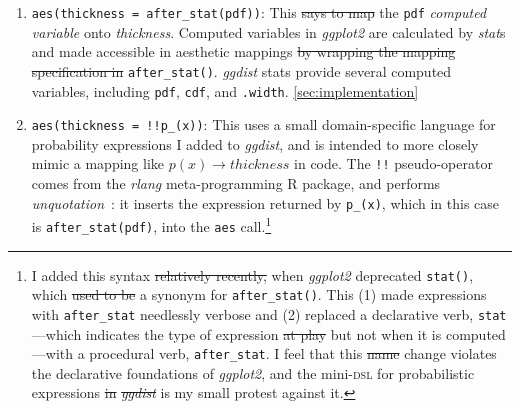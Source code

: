\documentclass[journal]{vgtc}                     %
\providecommand{\DIFadd}[1]{{\protect\color{blue}\uwave{#1}}} %
\providecommand{\DIFdel}[1]{{\protect\color{red}\sout{#1}}}                      %
\providecommand{\DIFaddbegin}{} %
\providecommand{\DIFaddend}{} %
\providecommand{\DIFdelbegin}{} %
\providecommand{\DIFdelend}{} %
\begin{document}
\begin{enumerate}
    \item \texttt{aes(thickness = after\_stat(pdf))}: This \DIFdelbegin \DIFdel{says to map }\DIFdelend \DIFaddbegin \DIFadd{maps }\DIFaddend the \texttt{pdf} \textit{computed variable} onto \textit{thickness}. Computed variables in \textit{ggplot2} are calculated by \textit{stat}s and made accessible in aesthetic mappings \DIFdelbegin \DIFdel{by wrapping the mapping specification in }\DIFdelend \DIFaddbegin \DIFadd{via }\DIFaddend \texttt{after\_stat()}. \textit{ggdist} stats provide several computed variables, including \texttt{pdf}, \texttt{cdf}, and \texttt{.width}. \DIFaddbegin \DIFadd{See }\cref{sec:implementation}\DIFadd{.
    }\DIFaddend \item \texttt{aes(thickness = !!p\_(x))}:  This uses a small domain-specific language for probability expressions I added to \textit{ggdist}, and is intended to more closely mimic a mapping like $p(x) \rightarrow thickness$ in code. The \texttt{!!} pseudo-operator comes from the \textit{rlang} meta-programming R package, and performs \textit{unquotation}~\cite{wickham2019advanced}: it inserts the expression returned by \texttt{p\_(x)}, which in this case is \texttt{after\_stat(pdf)}, into the \texttt{aes} call.\footnote{\DIFaddbegin \label{foot:after-stat} \DIFaddend I added this syntax \DIFdelbegin \DIFdel{relatively recently, }\DIFdelend when \textit{ggplot2} deprecated \texttt{stat()}, which \DIFdelbegin \DIFdel{used to be }\DIFdelend \DIFaddbegin \DIFadd{was }\DIFaddend a synonym for \texttt{after\_stat()}. This (1) made expressions with \texttt{after\_stat} needlessly verbose and (2) replaced a declarative verb, \texttt{stat}---which indicates the type of expression \DIFdelbegin \DIFdel{at play }\DIFdelend but not when it is computed---with a procedural verb, \texttt{after\_stat}. I feel that this \DIFdelbegin \DIFdel{name }\DIFdelend change violates the declarative foundations of \textit{ggplot2}, and the mini-\textsc{dsl} for probabilistic expressions \DIFdelbegin \DIFdel{in }\textit{\DIFdel{ggdist}} %
\DIFdelend is my small protest against it.}
\end{enumerate}
\end{document}

